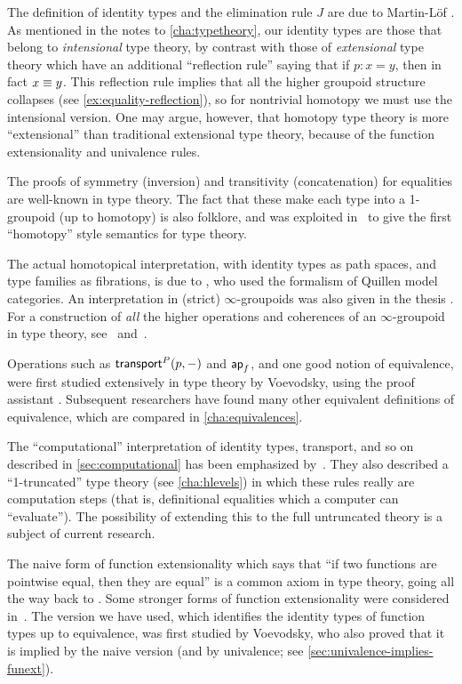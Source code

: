 \sectionNotes

The definition of identity types and the elimination rule $J$ are due to Martin-L\"of \cite{Martin-Lof-1972}.
As mentioned in the notes to \autoref{cha:typetheory}, our identity types are those that belong to \emph{intensional} type theory, by contrast with those of \emph{extensional} type theory which have an additional ``reflection rule'' saying that if $p:x=y$, then in fact $x\equiv y$.
This reflection rule implies that all the higher groupoid structure collapses (see \autoref{ex:equality-reflection}), so for nontrivial homotopy we must use the intensional version. 
One may argue, however, that homotopy type theory is more ``extensional'' than traditional extensional type theory, because of the function extensionality and univalence rules.  

The proofs of symmetry (inversion) and transitivity (concatenation) for equalities are well-known in type theory.
The fact that these make each type into a 1-groupoid (up to homotopy) is also folklore, and was exploited in~\cite{hs:gpd-typethy} to give the first ``homotopy'' style semantics for type theory.  

The actual homotopical interpretation, with identity types as path spaces, and type families as fibrations, is due to \cite{AW}, who used the formalism of Quillen model categories.  An interpretation in (strict) $\infty$-groupoids was also given in the thesis \cite{mw:thesis}.
For a construction of \emph{all} the higher operations and coherences of an $\infty$-groupoid in type theory, see~\cite{pll:wkom-type} and~\cite{bg:type-wkom}.

Operations such as $\mathsf{transport}^{P}(p,-)$ and $\mathsf{ap}_{f}$, and one good notion of equivalence, were first studied extensively in type theory by Voevodsky, using the proof assistant \Coq.
Subsequent researchers have found many other equivalent definitions of equivalence, which are compared in \autoref{cha:equivalences}.

The ``computational'' interpretation of identity types, transport, and so on described in \autoref{sec:computational} has been emphasized by~\cite{lh:canonicity}.
They also described a ``1-truncated'' type theory (see \autoref{cha:hlevels}) in which these rules really are computation steps (that is, definitional equalities which a computer can ``evaluate'').
The possibility of extending this to the full untruncated theory is a subject of current research.

The naive form of function extensionality which says that ``if two functions are pointwise equal, then they are equal'' is a common axiom in type theory, going all the way back to \cite{PM2}.
Some stronger forms of function extensionality were considered in~\cite{garner:depprod}.
The version we have used, which identifies the identity types of function types up to equivalence, was first studied by Voevodsky, who also proved that it is implied by the naive version (and by univalence; see \autoref{sec:univalence-implies-funext}).

